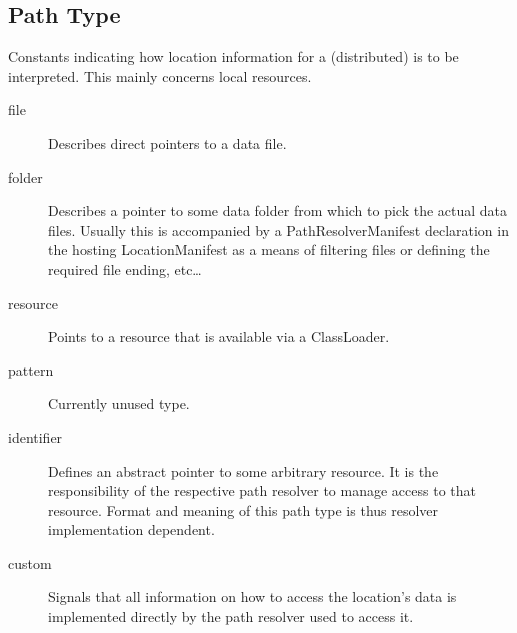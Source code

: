 \documentclass[11pt,a4paper]{report}
\begin{document}
\subsection{Path Type}
Constants indicating how location information for a (distributed) is to be interpreted. This mainly concerns local resources.
\label{sec:enum-path-type}
\begin{description}
	\item[file] Describes direct pointers to a data file.
	\item[folder] Describes a pointer to some data folder from which to pick the actual data files. Usually this is accompanied by a PathResolverManifest declaration in the hosting LocationManifest as a means of filtering files or defining the required file ending, etc\dots
	\item[resource] Points to a resource that is available via a ClassLoader.
	\item[pattern] Currently unused type.
	\item[identifier] Defines an abstract pointer to some arbitrary resource. It is the responsibility of the respective path resolver to manage access to that resource. Format and meaning of this path type is thus resolver implementation dependent.
	\item[custom] Signals that all information on how to access the location's data is implemented directly by the path resolver used to access it.
\end{description}
	
\end{document}
